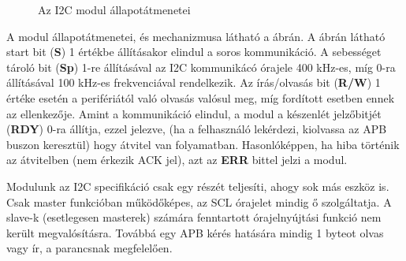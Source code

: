 \begin{figure}
    \centering
    \caption{Az I2C modul állapotátmenetei}
    \label{fig:statemachine}
\end{figure}
A modul állapotátmenetei, és mechanizmusa látható a  ábrán. A  ábrán látható start bit (\textbf{S}) 1 értékbe állításakor elindul a soros kommunikáció. A sebességet tároló bit (\textbf{Sp}) 1-re állításával az I2C kommunikácó órajele 400 kHz-es, míg 0-ra állításával 100 kHz-es frekvenciával rendelkezik. Az írás/olvasás bit (\textbf{R/W}) 1 értéke esetén a perifériától való olvasás valósul meg, míg fordított esetben ennek az ellenkezője. Amint a kommunikáció elindul, a modul a készenlét jelzőbitjét (\textbf{RDY}) 0-ra állítja, ezzel jelezve, (ha a felhasználó lekérdezi, kiolvassa az APB buszon keresztül) hogy átvitel van folyamatban. Hasonlóképpen, ha hiba történik az átvitelben (nem érkezik ACK jel), azt az \textbf{ERR} bittel jelzi a modul.

Modulunk az I2C specifikáció csak egy részét teljesíti, ahogy sok más eszköz is. Csak master funkcióban működőképes, az SCL órajelet mindig ő szolgáltatja. A slave-k (esetlegesen masterek) számára fenntartott órajelnyújtási funkció nem került megvalósításra. Továbbá egy APB kérés hatására mindig 1 byteot olvas vagy ír, a parancsnak megfelelően.
